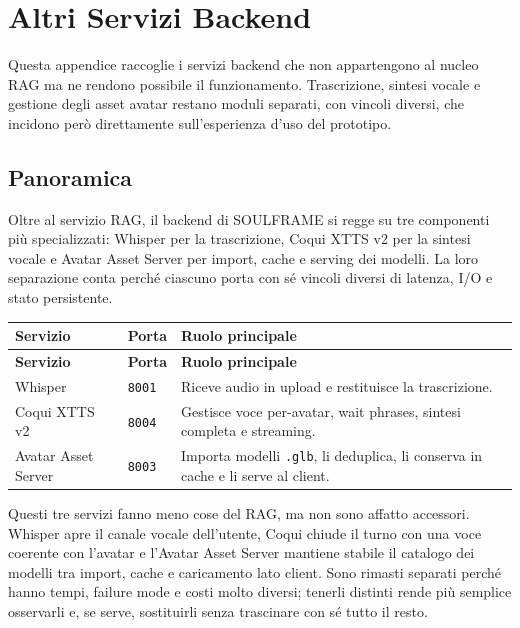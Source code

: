 \chapter{Altri Servizi Backend}
\label{app:backend-services}

Questa appendice raccoglie i servizi backend che non appartengono al nucleo RAG ma ne rendono possibile il funzionamento. Trascrizione, sintesi vocale e gestione degli asset avatar restano moduli separati, con vincoli diversi, che incidono però direttamente sull'esperienza d'uso del prototipo.

\section*{Panoramica}
Oltre al servizio RAG, il backend di SOULFRAME si regge su tre componenti più specializzati: Whisper per la trascrizione, Coqui XTTS v2 per la sintesi vocale e Avatar Asset Server per import, cache e serving dei modelli. La loro separazione conta perché ciascuno porta con sé vincoli diversi di latenza, I/O e stato persistente.

\par\begingroup
\small
\setlength{\LTleft}{0pt}
\setlength{\LTright}{0pt}
\captionsetup{type=table}
\label{tab:appendix-backend-overview}
\begin{longtable}{|>{\raggedright\arraybackslash}p{}|>{\raggedright\arraybackslash}p{}|>{\raggedright\arraybackslash}p{}|}
\hline
\textbf{Servizio} & \textbf{Porta} & \textbf{Ruolo principale} \\
\hline
\endfirsthead
\hline
\textbf{Servizio} & \textbf{Porta} & \textbf{Ruolo principale} \\
\hline
\endhead
Whisper & \texttt{8001} & Riceve audio in upload e restituisce la trascrizione. \\
\hline
Coqui XTTS v2 & \texttt{8004} & Gestisce voce per-avatar, wait phrases, sintesi completa e streaming. \\
\hline
Avatar Asset Server & \texttt{8003} & Importa modelli \texttt{.glb}, li deduplica, li conserva in cache e li serve al client. \\
\hline
\end{longtable}
\par\endgroup

Questi tre servizi fanno meno cose del RAG, ma non sono affatto accessori. Whisper apre il canale vocale dell'utente, Coqui chiude il turno con una voce coerente con l'avatar e l'Avatar Asset Server mantiene stabile il catalogo dei modelli tra import, cache e caricamento lato client. Sono rimasti separati perché hanno tempi, failure mode e costi molto diversi; tenerli distinti rende più semplice osservarli e, se serve, sostituirli senza trascinare con sé tutto il resto.

